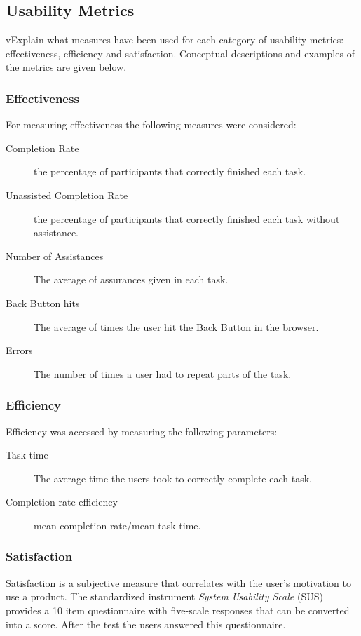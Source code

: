 \documentclass[a4paper]{article}
\begin{document}
\subsection{Usability Metrics}
vExplain what measures have been used for each category of usability metrics: effectiveness, efficiency and satisfaction. Conceptual descriptions and examples of the metrics are given below.

\subsubsection{Effectiveness}
For measuring effectiveness the following measures were considered:
  \begin{description}
    

    \item[Completion Rate] the percentage of participants that correctly finished each task.
 \item[Unassisted Completion Rate] the percentage of participants that correctly finished each task without assistance.
 \item[Number of Assistances] The average of assurances given in each task.
 \item[Back Button hits] The average of times the user hit the Back Button in the browser.
 \item[Errors] The number of times a user had to repeat parts of the task.
  \end{description} 
 
 \subsubsection{Efficiency}
 Efficiency was accessed by measuring the following parameters:
\begin{description}  

  \item[Task time] The average time the users took to correctly complete each task.
 \item[Completion rate efficiency] mean completion rate/mean task time.
\end{description} 
 
 \subsubsection{Satisfaction}
 Satisfaction is a subjective measure that correlates with the user's motivation to use a product. The standardized instrument \textit{System Usability Scale} (SUS) provides a 10 item questionnaire with five-scale responses that can be converted into a score. After the test the users answered this questionnaire. 
 
\end{document}
